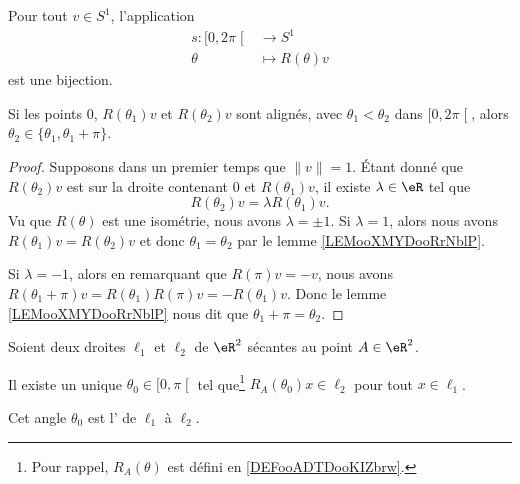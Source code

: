 \begin{lemma}       \label{LEMooXMYDooRrNblP}
	Pour tout \( v\in S^1\), l'application
	\begin{equation}
		\begin{aligned}
			s\colon \mathopen[ 0 , 2\pi \mathclose[ & \to S^1            \\
			\theta                                  & \mapsto R(\theta)v
		\end{aligned}
	\end{equation}
	est une bijection.
\end{lemma}

\begin{lemma}        \label{LEMooMFXWooGymSoF}
	Si les points \( 0\), \( R(\theta_1)v\) et \( R(\theta_2)v\) sont alignés, avec \( \theta_1<\theta_2\) dans \( \mathopen[ 0 , 2\pi \mathclose[\), alors \( \theta_2\in\{ \theta_1,\theta_1+\pi \}\).
\end{lemma}

\begin{proof}
	Supposons dans un premier temps que \( \| v \|=1\). Étant donné que \( R(\theta_2)v\) est sur la droite contenant \( 0\) et \( R(\theta_1)v\), il existe \( \lambda\in \eR\) tel que
	\begin{equation}
		R(\theta_2)v=\lambda R(\theta_1)v.
	\end{equation}
	Vu que \( R(\theta)\) est une isométrie, nous avons \( \lambda=\pm 1\). Si \( \lambda=1\), alors nous avons \( R(\theta_1)v=R(\theta_2)v\) et donc \( \theta_1=\theta_2\) par le lemme \ref{LEMooXMYDooRrNblP}.

	Si \( \lambda=-1\), alors en remarquant que \( R(\pi)v=-v\), nous avons \( R(\theta_1+\pi)v=R(\theta_1)R(\pi)v=-R(\theta_1)v\). Donc le lemme \ref{LEMooXMYDooRrNblP} nous dit que \( \theta_1+\pi=\theta_2\).
\end{proof}

\begin{lemmaDef}        \label{DEFooEGKOooRPGOAs}
	Soient deux droites \( \ell_1\) et \( \ell_2\) de \( \eR^2\) sécantes au point \( A\in \eR^2\).

	Il existe un unique \( \theta_0\in\mathopen[ 0 , \pi \mathclose[\) tel que\footnote{Pour rappel, \( R_A(\theta)\) est défini en \ref{DEFooADTDooKIZbrw}.} \( R_A(\theta_0)x\in \ell_2\) pour tout \( x\in\ell_1\).

	Cet angle \( \theta_0\) est l' de \( \ell_1\) à \( \ell_2\).
\end{lemmaDef}

